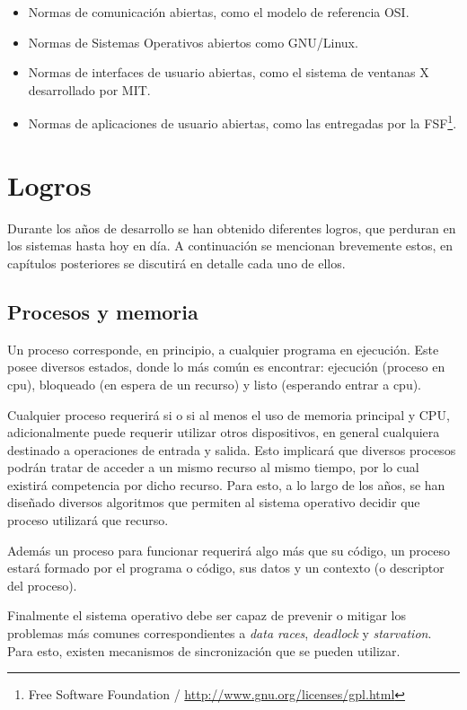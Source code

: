 \begin{itemize}

	\item Normas de comunicación abiertas, como el modelo de referencia OSI.

	\item Normas de Sistemas Operativos abiertos como GNU/Linux.

	\item Normas de interfaces de usuario abiertas, como el sistema de
	ventanas X desarrollado por MIT.

	\item Normas de aplicaciones de usuario abiertas, como las entregadas
	por la FSF\footnote{Free Software Foundation /
	\url{http://www.gnu.org/licenses/gpl.html}}.

\end{itemize}

\section{Logros}
Durante los años de desarrollo se han obtenido diferentes logros, que perduran
en los sistemas hasta hoy en día. A continuación se mencionan brevemente estos,
en capítulos posteriores se discutirá en detalle cada uno de ellos.

\subsection{Procesos y memoria}
Un proceso corresponde, en principio, a cualquier programa en ejecución. Este
posee diversos estados, donde lo más común es encontrar: ejecución (proceso en
cpu), bloqueado (en espera de un recurso) y listo (esperando entrar a cpu).

Cualquier proceso requerirá si o si al menos el uso de memoria principal y CPU,
adicionalmente puede requerir utilizar otros dispositivos, en general cualquiera
destinado a operaciones de entrada y salida. Esto implicará que diversos
procesos podrán tratar de acceder a un mismo recurso al mismo tiempo, por lo
cual existirá competencia por dicho recurso. Para esto, a lo largo de los años,
se han diseñado diversos algoritmos que permiten al sistema operativo decidir
que proceso utilizará que recurso.

Además un proceso para funcionar requerirá algo más que su código, un proceso
estará formado por el programa o código, sus datos y un contexto (o descriptor
del proceso).

Finalmente el sistema operativo debe ser capaz de prevenir o mitigar los
problemas más comunes correspondientes a \textit{data races}, \textit{deadlock}
y \textit{starvation}. Para esto, existen mecanismos de sincronización que se
pueden utilizar.

